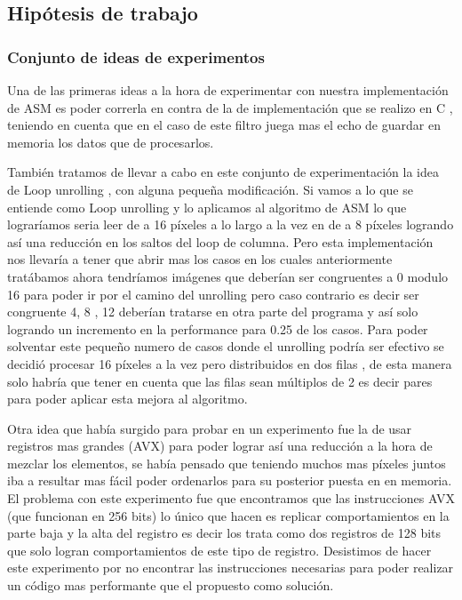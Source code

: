 \subsection{Hipótesis de trabajo}
\subsubsection*{Conjunto de ideas de experimentos}
Una de las primeras ideas a la hora de experimentar con nuestra implementación de ASM es poder correrla en contra de la de implementación que se realizo en C , teniendo en cuenta que en el caso de este filtro juega mas el echo de guardar en memoria los datos que de procesarlos.

También tratamos de llevar a cabo en este conjunto de experimentación la idea de Loop unrolling , con alguna pequeña modificación. Si vamos a lo que se entiende como Loop unrolling y lo aplicamos al algoritmo de ASM lo que lograríamos seria leer de a 16 píxeles a lo largo a la vez en de a 8 píxeles logrando así una reducción en los saltos del loop de columna. Pero esta implementación nos llevaría a tener que abrir mas los casos en los cuales anteriormente tratábamos ahora tendríamos imágenes que deberían ser congruentes a 0 modulo 16 para poder ir por el camino del unrolling pero caso contrario es decir ser congruente 4, 8 , 12 deberían tratarse en otra parte del programa y así solo logrando un incremento en la performance para 0.25 de los casos. Para poder solventar este pequeño numero de casos donde el unrolling podría ser efectivo se decidió procesar 16 píxeles a la vez pero distribuidos en dos filas , de esta manera solo habría que tener en cuenta que las filas sean múltiplos de 2 es decir pares para poder aplicar esta mejora al algoritmo.

Otra idea que había surgido para probar en un experimento fue la de usar registros mas grandes (AVX) para poder lograr así una reducción a la hora de mezclar los elementos, se había pensado que teniendo muchos mas píxeles juntos iba a resultar mas fácil poder ordenarlos para su posterior puesta en en memoria. El problema con este experimento fue que encontramos que las instrucciones AVX (que funcionan en 256 bits) lo único que hacen es replicar comportamientos en la parte baja y la alta del registro es decir los trata como dos registros de 128 bits que solo logran comportamientos de este tipo de registro. Desistimos de hacer este experimento por no encontrar las instrucciones necesarias para poder realizar un código mas performante que el propuesto como solución. 
